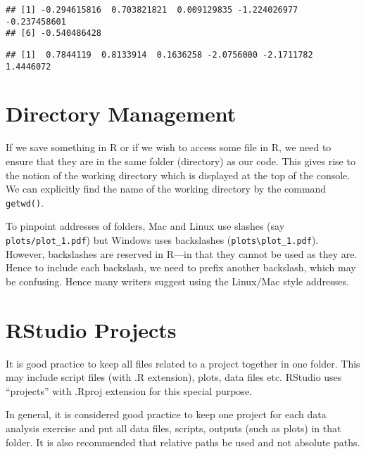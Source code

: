\documentclass[11pt,]{article}
\newenvironment{Shaded}{\begin{snugshade}}{\end{snugshade}}
\newcommand{\KeywordTok}[1]{\textcolor[rgb]{0.13,0.29,0.53}{\textbf{#1}}}
\newcommand{\DecValTok}[1]{\textcolor[rgb]{0.00,0.00,0.81}{#1}}
\newcommand{\StringTok}[1]{\textcolor[rgb]{0.31,0.60,0.02}{#1}}
\newcommand{\OperatorTok}[1]{\textcolor[rgb]{0.81,0.36,0.00}{\textbf{#1}}}
\newcommand{\NormalTok}[1]{#1}
\begin{document}
\begin{verbatim}
## [1] -0.294615816  0.703821821  0.009129835 -1.224026977 -0.237458601
## [6] -0.540486428
\end{verbatim}

\begin{Shaded}
\end{Shaded}

\begin{verbatim}
## [1]  0.7844119  0.8133914  0.1636258 -2.0756000 -2.1711782  1.4446072
\end{verbatim}

\section{Directory Management}\label{directory-management}

If we save something in R or if we wish to access some file in R, we
need to ensure that they are in the same folder (directory) as our code.
This gives rise to the notion of the working directory which is
displayed at the top of the console. We can explicitly find the name of
the working directory by the command \texttt{getwd()}.

To pinpoint addresses of folders, Mac and Linux use slashes (say
\texttt{plots/plot\_1.pdf}) but Windows uses backslashes
(\texttt{plots\textbackslash{}plot\_1.pdf}). However, backslashes are
reserved in R---in that they cannot be used as they are. Hence to
include each backslash, we need to prefix another backslash, which may
be confusing. Hence many writers suggest using the Linux/Mac style
addresses.

\section{RStudio Projects}\label{rstudio-projects}

It is good practice to keep all files related to a project together in
one folder. This may include script files (with .R extension), plots,
data files etc. RStudio uses ``projects'' with .Rproj extension for this
special purpose.

In general, it is considered good practice to keep one project for each
data analysis exercise and put all data files, scripts, outputs (such as
plots) in that folder. It is also recommended that relative paths be
used and not absolute paths.
\end{document}
